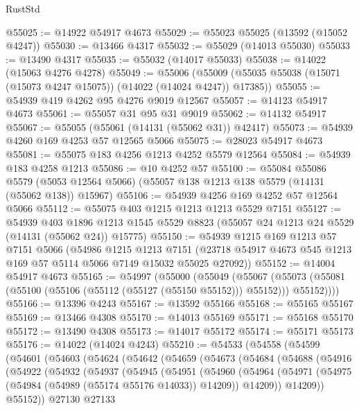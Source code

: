 \begin{lexlean}{RustStd}
\begin{coremodule}
@55025 := @14922 @54917 @4673
@55029 := @55023 @55025 (@13592 (@15052 @4247))
@55030 := @13466 @4317
@55032 := @55029 (@14013 @55030)
@55033 := @13490 @4317
@55035 := @55032 (@14017 @55033)
@55038 := @14022 (@15063 @4276 @4278)
@55049 := @55006
    (@55009 (@55035 @55038 (@15071 (@15073 @4247 @15075)) (@14022 (@14024 @4247)) @17385))
@55055 := @54939 @419 @4262 @95 @4276 @9019 @12567
@55057 := @14123 @54917 @4673
@55061 := @55057 @31 @95 @31 @9019
@55062 := @14132 @54917
@55067 := @55055 (@55061 (@14131 (@55062 @31)) @42417)
@55073 := @54939 @4260 @169 @4253 @57 @12565 @5066
@55075 := @28023 @54917 @4673
@55081 := @55075 @183 @4256 @1213 @4252 @5579 @12564
@55084 := @54939 @183 @4258 @1213
@55086 := @10 @4252 @57
@55100 := @55084
    @55086
    @5579
    (@5053 @12564 @5066)
    (@55057 @138 @1213 @138 @5579 (@14131 (@55062 @138)) @15967)
@55106 := @54939 @4256 @169 @4252 @57 @12564 @5066
@55112 := @55075 @403 @1215 @1213 @1213 @5529 @7151
@55127 := @54939
    @403
    @1896
    @1213
    @1545
    @5529
    @8823
    (@55057 @24 @1213 @24 @5529 (@14131 (@55062 @24)) @15775)
@55150 := @54939
    @1215
    @169
    @1213
    @57
    @7151
    @5066
    (@54986
      @1215
      @1213
      @7151
      (@23718 @54917 @4673 @545 @1213 @169 @57 @5114 @5066 @7149 @15032 @55025 @27092))
@55152 := @14004 @54917 @4673
@55165 := @54997
    (@55000
      (@55049
        (@55067
          (@55073 (@55081 (@55100 (@55106 (@55112 (@55127 (@55150 @55152))) @55152))) @55152))))
@55166 := @13396 @4243
@55167 := @13592 @55166
@55168 := @55165 @55167
@55169 := @13466 @4308
@55170 := @14013 @55169
@55171 := @55168 @55170
@55172 := @13490 @4308
@55173 := @14017 @55172
@55174 := @55171 @55173
@55176 := @14022 (@14024 @4243)
@55210 := @54533
    (@54558
      (@54599
        (@54601
          (@54603
            (@54624
              (@54642
                (@54659
                  (@54673
                    (@54684
                      (@54688
                        (@54916
                          (@54922
                            (@54932
                              (@54937
                                (@54945
                                  (@54951
                                    (@54960
                                      (@54964
                                        (@54971
                                          (@54975 (@54984 (@54989 (@55174 @55176 @14033)) @14209))
                                          @14209))
                                      @14209))
                                  @55152))
                              @27130
                              @27133

\end{coremodule}
\end{lexlean}
